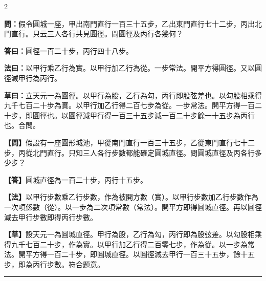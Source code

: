 \documentclass[11pt,a4paper]{article}
\newcommand{\longline}{\noindent\rule{\textwidth}{0.4pt}}
\newcommand{\wenC}[1]{\par\noindent\textbf{\textcolor{probcolor}{問：}}{#1}\par}
\newcommand{\daC}[1]{\par\noindent\textbf{\textcolor{anscolor}{答曰：}}{#1}\par}
\newcommand{\fayueC}[1]{\par\noindent\textbf{\textcolor{methodcolor}{法曰：}}{#1}\par}
\newcommand{\caoyueC}[1]{\par\noindent\textbf{草曰：}{#1}\par}
\newcommand{\wenM}[1]{\par\noindent\textbf{\textcolor{probcolor}{【問】}}{#1}\par}
\newcommand{\daM}[1]{\par\noindent\textbf{\textcolor{anscolor}{【答】}}{#1}\par}
\newcommand{\fayueM}[1]{\par\noindent\textbf{\textcolor{methodcolor}{【法】}}{#1}\par}
\newcommand{\caoyueM}[1]{\par\noindent\textbf{【草】}{#1}\par}
\begin{document}
\begin{paracol}{2}

\wenC{假令圓城一座，甲出南門直行一百三十五步，乙出東門直行七十二步，丙出北門直行。只云三人各行共見圓徑。問圓徑及丙行各幾何？}

\daC{圓徑一百二十步，丙行四十八步。}

\fayueC{以甲行乘乙行為實。以甲行加乙行為從。一步常法。開平方得圓徑。又以圓徑減甲行為丙行。}

\caoyueC{立天元一為圓徑。以甲行為股，乙行為勾，丙行即股弦差也。以勾股相乘得九千七百二十步為實。以甲行加乙行得二百七步為從。一步常法。開平方得一百二十步，即圓徑也。以圓徑減甲行得一百三十五步減一百二十步餘一十五步為丙行也。合問。}

\switchcolumn

\wenM{假設有一座圓形城池，甲從南門直行一百三十五步，乙從東門直行七十二步，丙從北門直行。只知三人各行步數都能確定圓城直徑。問圓城直徑及丙各行多少步？}

\daM{圓城直徑為一百二十步，丙行十五步。}

\fayueM{以甲行步數乘乙行步數，作為被開方數（實）。以甲行步數加乙行步數作為一次項係數（從）。以一步為二次項常數（常法）。開平方即得圓城直徑。再以圓徑減去甲行步數即得丙行步數。}

\caoyueM{設天元一為圓城直徑。甲行為股，乙行為勾，丙行即為股弦差。以勾股相乘得九千七百二十步，作為實。以甲行加乙行得二百零七步，作為從。以一步為常法。開平方得一百二十步，即圓城直徑。以圓徑減去甲行一百三十五步，餘十五步，即為丙行步數。符合題意。}

\end{paracol}

\vspace{0.3cm}
\longline
\end{document}
